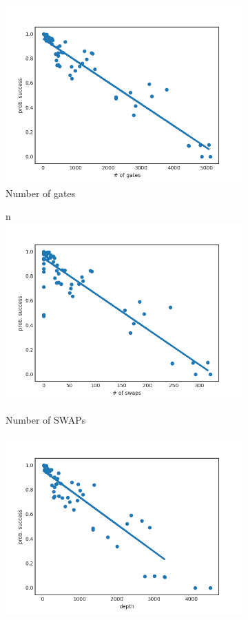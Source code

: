 \documentclass[11pt]{article}
\begin{document}
\begin{figure}[H] 
  \begin{subfigure}[b]{0.5\linewidth}
    \centering
    \includegraphics[width=0.75\linewidth]{ps_g_3000_0} 
    \caption{Number of gates} 
    \label{fig:ps_g_3000_0} 
    \vspace{4ex}
  \end{subfigure}%
  \begin{subfigure}[b]{0.5\linewidth}
n    \centering
    \includegraphics[width=0.75\linewidth]{ps_s_3000_0} 
    \caption{Number of SWAPs} 
    \label{fig:ps_s_3000_0} 
    \vspace{4ex}
  \end{subfigure} 
  \begin{subfigure}[b]{0.5\linewidth}
    \centering
    \includegraphics[width=0.75\linewidth]{ps_d_3000_0} 

\end{subfigure}
\end{figure}
\end{document}
